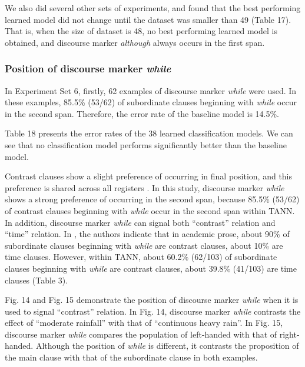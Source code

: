 \documentclass[english]{jnlp_1.3e}
\begin{document}
We also did several other sets of experiments, and found that
the best performing learned model did not change until the dataset was smaller 
than 49 (Table 17). That is, when the size of dataset is 48, 
no best performing learned model is obtained, and discourse marker
\textit{although} always occurs in the first span.



\subsubsection{Position of discourse marker \textit{while}}  

In Experiment Set 6, firstly, 62 examples of discourse marker \textit{while} 
were used. In these examples, 85.5\% (53/62) of subordinate clauses
beginning with \textit{while} occur in the second span. 
Therefore, the error rate of the baseline model is 14.5\%. 

\begin{table}[b]

\end{table}

Table 18 presents the error rates of the 38 learned classification models. 
We can see that no classification model performs significantly better than 
the baseline model. 



Contrast clauses show a slight preference of occurring in final 
position, and this preference is shared across all registers \cite{Biber99}. 
In this study, discourse marker \textit{while} shows a strong 
preference of occurring in the second span, because 85.5\% (53/62) 
of contrast clauses beginning with \textit{while} occur in the second span
within TANN. In addition, discourse marker \textit{while} 
can signal both ``contrast'' relation and ``time'' relation. 
In \cite{Biber99}, the authors indicate that in 
academic prose, about 90\% of subordinate clauses beginning with \textit{while} 
are contrast clauses, about 10\% are time clauses. However, within TANN, 
about 60.2\% (62/103) of subordinate clauses beginning with \textit{while} are contrast
clauses, about 39.8\% (41/103) are time clauses (Table 3).

Fig. 14 and Fig. 15 demonstrate the position of discourse marker 
\textit{while} when it is used to signal ``contrast'' relation. 
In Fig. 14, discourse marker \textit{while} contrasts the effect of 
``moderate rainfall'' with that of ``continuous heavy rain''. In Fig. 15, 
discourse marker \textit{while} compares the population of left-handed with
that of right-handed. Although the position of \textit{while} is different,
it contrasts the proposition of the main clause with that of the subordinate clause
in both examples.
\end{document}
